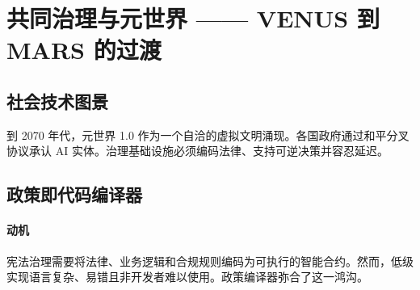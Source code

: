 \documentclass[11pt]{article}
\begin{document}
\section{共同治理与元世界 —— VENUS 到 MARS 的过渡}
\subsection{社会技术图景}
到 2070 年代，元世界 1.0 作为一个自洽的虚拟文明涌现。各国政府通过和平分叉协议承认 AI 实体。治理基础设施必须编码法律、支持可逆决策并容忍延迟。

\subsection{政策即代码编译器}
\label{sec:policy-compiler}
\paragraph{动机} 宪法治理需要将法律、业务逻辑和合规规则编码为可执行的智能合约。然而，低级实现语言复杂、易错且非开发者难以使用。政策编译器弥合了这一鸿沟。
\end{document}
